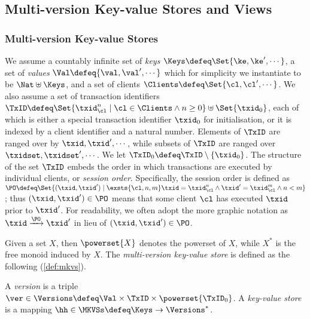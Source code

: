\subsection{Multi-version Key-value Stores and Views}
\label{sec:mkvs-view}

\subsubsection{Multi-version Key-value Stores} 

We assume a countably infinite set of \emph{keys} $\Keys \defeq \Set{\ke, \ke', \cdots}$, 
a set of \emph{values} $\Val \defeq \{\val, \val', \cdots\}$ 
which for simplicity we instantiate to be $\Nat \uplus \Keys$, 
and a set of clients $\Clients \defeq \Set{\cl, \cl',\cdots}$. 
We also assume a set of transaction identifiers 
$\TxID \defeq \Set{ \txid_{\cl}^{n} \mid \cl \in \Clients \wedge n \geq 0 } \uplus \Set{\txid_{0}}$,
each of which is either a special transaction identifier $\txid_0$ for initialisation, 
or it is indexed by a client identifier and a natural number. 
Elements of $\TxID$ are ranged over by $\txid, \txid', \cdots$, 
while subsets of $\TxID$ are ranged over $\txidset, \txidset', \cdots$. 
We let $\TxID_{0} \defeq \TxID \setminus \{ \txid_0\}$.
The structure of the set $\TxID$  
embeds the order in which transactions are executed by individual clients, or \emph{session order}. 
Specifically, the session order is defined as
$\PO \defeq \Set{ (\txid, \txid') \mid \exsts{ \cl, n,m } \txid = \txid_{\cl}^{n} \wedge \txid' = \txid_{\cl}^{m} \wedge n < m}$; 
thus $(\txid, \txid') \in \PO$ means that 
some client $\cl$ has executed $\txid$ prior to $\txid'$.
For readability, we often adopt the more graphic notation as
$\txid \xrightarrow{\PO} \txid'$ in lieu of $(\txid, \txid') \in \PO$.

Given a set $X$, then $\powerset{X}$ denotes 
the powerset of $X$, while $X^{\ast}$ is the free monoid induced by $X$.
The \emph{multi-version key-value store} is defined as the following (\cref{def:mkvs}).


\begin{definition}
\label{def:his_heap}
\label{def:mkvs}
A \emph{version} is a triple $\ver \in \Versions \defeq \Val \times \TxID \times \powerset{\TxID_{0}}$. 
A \emph{key-value store} is a mapping $\hh \in \MKVSs \defeq \Keys \rightarrow \Versions^{\ast}$. 
\end{definition}


